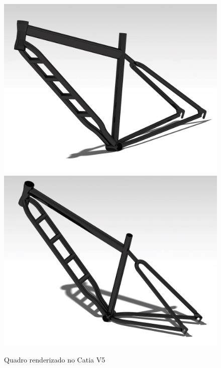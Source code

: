 	\graphicspath{{figuras/}}
	\begin{figure}[!htb]
		\centering
		\includegraphics[scale=0.035]{inter_render_2.jpg}
		\includegraphics[scale=0.035]{inter_render_1.jpg}
		\caption{Quadro renderizado no Catia V5}
		\label{img:inter_render}
	\end{figure}
	


